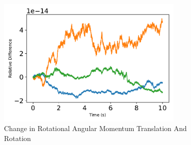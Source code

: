 \begin{figure}[htbp]\centerline{\includegraphics[width=0.8\textwidth]{AutoTeX/scPlusChangeInRotationalAngularMomentumTranslationAndRotation}}\caption{Change in Rotational Angular Momentum Translation And Rotation}\label{fig:scPlusChangeInRotationalAngularMomentumTranslationAndRotation}\end{figure}